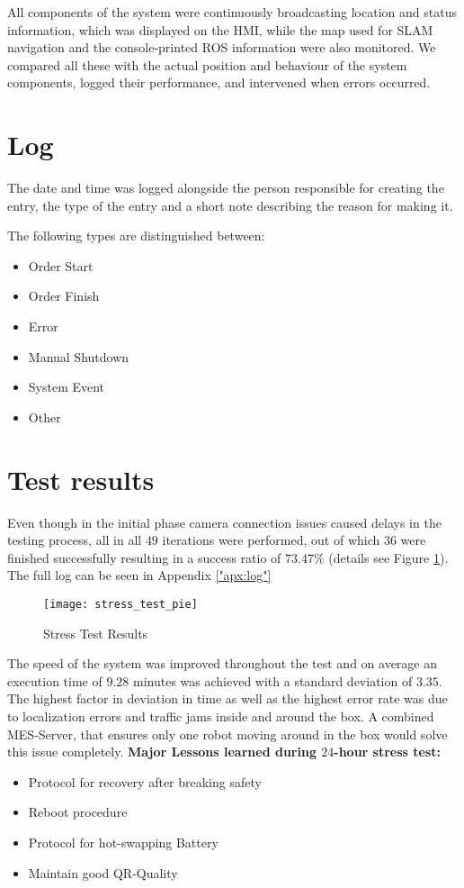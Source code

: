 All components of the system were continuously broadcasting location and status information, which was displayed on the HMI, while the map used for SLAM navigation and the console-printed ROS information were also monitored. We compared all these with the actual position and behaviour of the system components, logged their performance, and intervened when errors occurred. 

\section{Log}
The date and time was logged alongside the person responsible for creating the entry, the type of the entry and a short note describing the reason for making it.

The following types are distinguished between:

\begin{itemize}
	\item Order Start
	\item Order Finish
	\item Error
	\item Manual Shutdown
	\item System Event
	\item Other
\end{itemize}

\section{Test results}
Even though in the initial phase camera connection issues caused delays in the testing process, all in all $49$ iterations were performed, out of which $36$ were finished successfully resulting in a success ratio of $73.47\%$ (details see Figure \ref{fig:order_statistics}). The full log can be seen in Appendix \ref{"apx:log"}

\begin{figure}[H]
	\centering
	\texttt{[image: stress\_test\_pie]}
	\caption{Stress Test Results}
	\label{fig:order_statistics}
\end{figure}

The speed of the system was improved throughout the test and on average an execution time of $9.28$ minutes was achieved with a standard deviation of $3.35$. The highest factor in deviation in time as well as the highest error rate was due to localization errors and traffic jams inside and around the box. A combined MES-Server, that ensures only one robot moving around in the box would solve this issue completely. 
\newpage
\textbf{Major Lessons learned during $24$-hour stress test:}
\begin{itemize}
\item Protocol for recovery after breaking safety
\item Reboot procedure
\item Protocol for hot-swapping Battery
\item Maintain good QR-Quality
\end{itemize}

